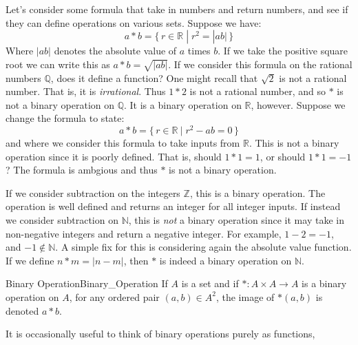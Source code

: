     \begin{example}
        Let's consider some formula that take in numbers and return numbers, and
        see if they can define operations on various sets. Suppose we have:
        \begin{equation}
            a*b=\{\,r\in\mathbb{R}\;|\;r^{2}=|ab|\,\}
        \end{equation}
        Where $|ab|$ denotes the absolute value of $a$ times $b$. If we take the
        positive square root we can write this as $a*b=\sqrt{|ab|}$. If we
        consider this formula on the rational numbers $\mathbb{Q}$, does it
        define a function? One might recall that $\sqrt{2}$ is not a rational
        number. That is, it is \textit{irrational}. Thus $1*2$ is not a rational
        number, and so $*$ is not a binary operation on $\mathbb{Q}$. It is a
        binary operation on $\mathbb{R}$, however. Suppose we change the formula
        to state:
        \begin{equation}
            a*b=\{\,r\in\mathbb{R}\:|\;r^{2}-ab=0\,\}
        \end{equation}
        and where we consider this formula to take inputs from $\mathbb{R}$.
        This is not a binary operation since it is poorly defined. That is,
        should $1*1=1$, or should $1*1=\minus{1}$? The formula is ambgious and
        thus $*$ is not a binary operation.
    \end{example}
    \begin{example}
        If we consider subtraction on the integers $\mathbb{Z}$, this is a
        binary operation. The operation is well defined and returns an integer
        for all integer inputs. If instead we consider subtraction on
        $\mathbb{N}$, this is \textit{not} a binary operation since it may take
        in non-negative integers and return a negative integer. For example,
        $1-2=\minus{1}$, and $\minus{1}\notin\mathbb{N}$. A simple fix for this
        is considering again the absolute value function. If we define
        $n*m=|n-m|$, then $*$ is indeed a binary operation on $\mathbb{N}$.
    \end{example}
    \begin{fnotation}{Binary Operation}{Binary_Operation}
        If $A$ is a set and if $*:A\times{A}\rightarrow{A}$ is a binary
        operation on $A$, for any ordered pair $(a,b)\in{A}^{2}$, the image
        of $*(a,b)$ is denoted $a*b$.
    \end{fnotation}
    It is occasionally useful to think of binary operations purely as functions,
